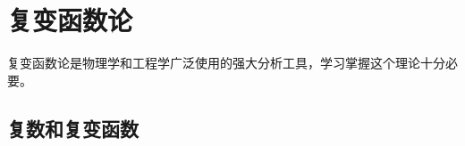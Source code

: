 

\chapter{复变函数论}
\label{chap:complexfunctions}
复变函数论是物理学和工程学广泛使用的强大分析工具，学习掌握这个理论十分必要。

\section{复数和复变函数}


